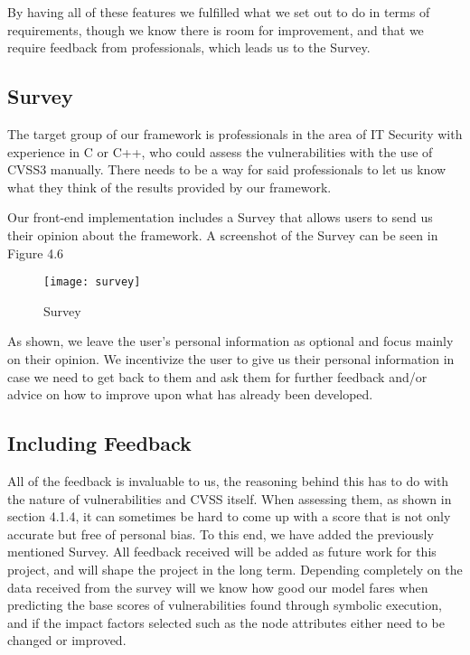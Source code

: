 By having all of these features we fulfilled what we set out to do in terms of requirements, though we know there is room for improvement, and that we require feedback from professionals, which leads us to the Survey.

\subsection{Survey}

The target group of our framework is professionals in the area of IT Security with experience in C or C++, who could assess the vulnerabilities with the use of CVSS3 manually. There needs to be a way for said professionals to let us know what they think of the results provided by our framework.

Our front-end implementation includes a Survey that allows users to send us their opinion about the framework. A screenshot of the Survey can be seen in Figure 4.6

\begin{figure}[H]
	\caption{Survey}
	\centering
	\texttt{[image: survey]}
\end{figure}

As shown, we leave the user's personal information as optional and focus mainly on their opinion. We incentivize the user to give us their personal information in case we need to get back to them and ask them for further feedback and/or advice on how to improve upon what has already been developed.

\subsection{Including Feedback}

All of the feedback is invaluable to us, the reasoning behind this has to do with the nature of vulnerabilities and CVSS itself. When assessing them, as shown in section 4.1.4, it can sometimes be hard to come up with a score that is not only accurate but free of personal bias. To this end, we have added the previously mentioned Survey. All feedback received will be added as future work for this project, and will shape the project in the long term. Depending completely on the data received from the survey will we know how good our model fares when predicting the base scores of vulnerabilities found through symbolic execution, and if the impact factors selected such as the node attributes either need to be changed or improved.


